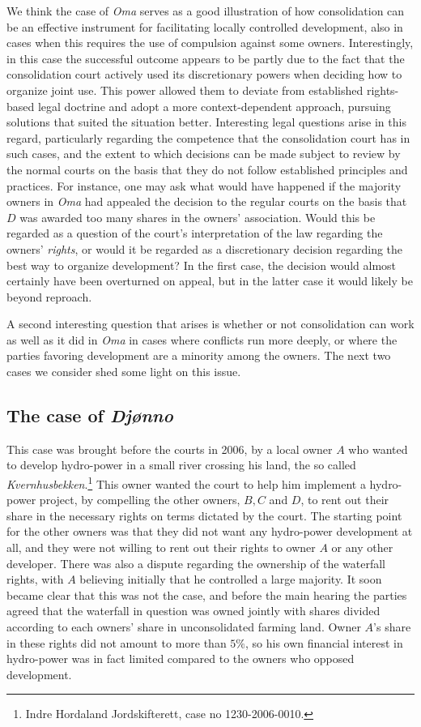 \documentclass[10pt]{article} %
\begin{document}
We think the case of \emph{Oma} serves as a good illustration of how consolidation can be an effective instrument for facilitating locally controlled development, also in cases when this requires the use of compulsion against some owners. Interestingly, in this case the successful outcome appears to be partly due to the fact that the consolidation court actively used its discretionary powers when deciding how to organize joint use. This power allowed them to deviate from established rights-based legal doctrine and adopt a more context-dependent approach, pursuing solutions that suited the situation better. Interesting legal questions arise in this regard, particularly regarding the competence that the consolidation court has in such cases, and the extent to which decisions can be made subject to review by the normal courts on the basis that they do not follow established principles and practices. For instance, one may ask what would have happened if the majority owners in \emph{Oma} had appealed the decision to the regular courts on the basis that $D$ was awarded too many shares in the owners' association. Would this be regarded as a question of the court's interpretation of the law regarding the owners' \emph{rights}, or would it be regarded as a discretionary decision regarding the best way to organize development? In the first case, the decision would almost certainly have been overturned on appeal, but in the latter case it would likely be beyond reproach.

A second interesting question that arises is whether or not consolidation can work as well as it did in \emph{Oma} in cases where conflicts run more deeply, or where the parties favoring development are a minority among the owners. The next two cases we consider shed some light on this issue.

\subsection{The case of \emph{Djønno}}

This case was brought before the courts in 2006, by a local owner $A$ who wanted to develop hydro-power in a small river crossing his land, the so called \emph{Kvernhusbekken}.\footnote{Indre Hordaland Jordskifterett, case no 1230-2006-0010.} This owner wanted the court to help him implement a hydro-power project, by compelling the other owners, $B, C$ and $D$, to rent out their share in the necessary rights on terms dictated by the court. The starting point for the other owners was that they did not want any hydro-power development at all, and they were not willing to rent out their rights to owner $A$ or any other developer. There was also a dispute regarding the ownership of the waterfall rights, with $A$ believing initially that he controlled a large majority. It soon became clear that this was not the case, and before the main hearing the parties agreed that the waterfall in question was owned jointly with shares divided according to each owners' share in unconsolidated farming land. Owner $A$'s share in these rights did not amount to more than $5 \%$, so his own financial interest in hydro-power was in fact limited compared to the owners who opposed development.
\end{document}
